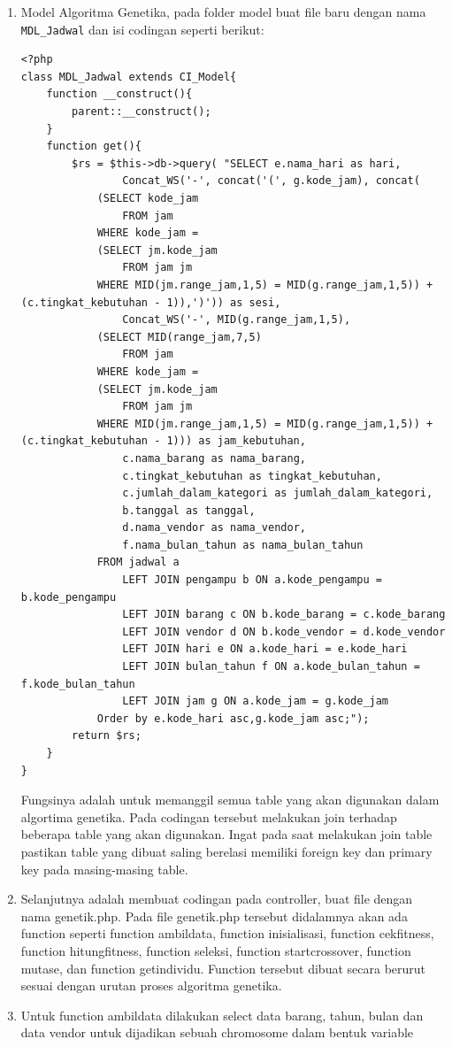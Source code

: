 \begin{enumerate}
    \item Model Algoritma Genetika, pada folder model buat file baru dengan nama \verb|MDL_Jadwal| dan isi codingan seperti berikut:
\begin{lstlisting}
<?php
class MDL_Jadwal extends CI_Model{
	function __construct(){
		parent::__construct();
	}
    function get(){
		$rs = $this->db->query(	"SELECT e.nama_hari as hari, 
				Concat_WS('-', concat('(', g.kode_jam), concat( 
			(SELECT kode_jam
				FROM jam
			WHERE kode_jam = 
			(SELECT jm.kode_jam 
				FROM jam jm
			WHERE MID(jm.range_jam,1,5) = MID(g.range_jam,1,5)) + (c.tingkat_kebutuhan - 1)),')')) as sesi,
				Concat_WS('-', MID(g.range_jam,1,5),
			(SELECT MID(range_jam,7,5)
				FROM jam
			WHERE kode_jam = 
			(SELECT jm.kode_jam
				FROM jam jm
			WHERE MID(jm.range_jam,1,5) = MID(g.range_jam,1,5)) + (c.tingkat_kebutuhan - 1))) as jam_kebutuhan,
				c.nama_barang as nama_barang,
				c.tingkat_kebutuhan as tingkat_kebutuhan,
				c.jumlah_dalam_kategori as jumlah_dalam_kategori,
				b.tanggal as tanggal,
				d.nama_vendor as nama_vendor,
				f.nama_bulan_tahun as nama_bulan_tahun
			FROM jadwal a
				LEFT JOIN pengampu b ON a.kode_pengampu = b.kode_pengampu
				LEFT JOIN barang c ON b.kode_barang = c.kode_barang
				LEFT JOIN vendor d ON b.kode_vendor = d.kode_vendor
				LEFT JOIN hari e ON a.kode_hari = e.kode_hari
				LEFT JOIN bulan_tahun f ON a.kode_bulan_tahun = f.kode_bulan_tahun
				LEFT JOIN jam g ON a.kode_jam = g.kode_jam
			Order by e.kode_hari asc,g.kode_jam asc;");
		return $rs;
	}
}
\end{lstlisting}
		\par Fungsinya adalah untuk memanggil semua table yang akan digunakan dalam algortima genetika. Pada codingan tersebut melakukan join terhadap beberapa table yang akan digunakan. Ingat pada saat melakukan join table pastikan table yang dibuat saling berelasi memiliki foreign key dan primary key pada masing-masing table.
		
	\item Selanjutnya adalah membuat codingan pada controller, buat file dengan nama genetik.php. Pada file genetik.php tersebut didalamnya akan ada function seperti function ambildata, function inisialisasi, function cekfitness, function hitungfitness, function seleksi, function startcrossover, function mutase, dan function getindividu. Function tersebut dibuat secara berurut sesuai dengan urutan proses algoritma genetika.
	
	\item Untuk function ambildata dilakukan select data barang, tahun, bulan dan data vendor untuk dijadikan sebuah chromosome dalam bentuk variable
	

\end{enumerate}
